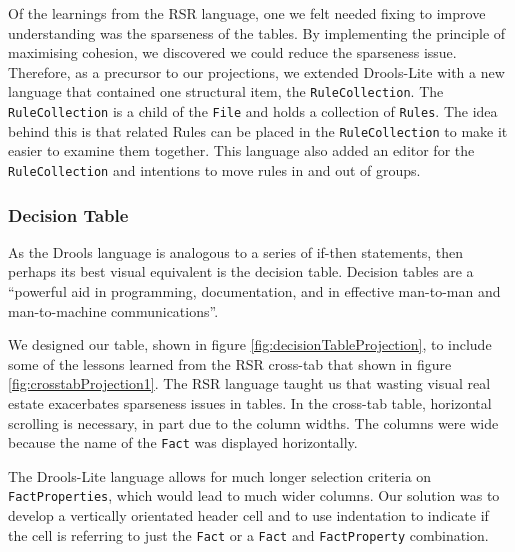 Of the learnings from the RSR language, one we felt needed fixing to improve understanding was the sparseness of the tables.
By implementing the principle of maximising cohesion, we discovered we could reduce the sparseness issue.
Therefore, as a precursor to our projections, we extended Drools-Lite with a new language that contained one structural item, the \texttt{RuleCollection}.
The \texttt{RuleCollection} is a child of the \texttt{File} and holds a collection of \texttt{Rules}.
The idea behind this is that related Rules can be placed in the \texttt{RuleCollection} to make it easier to examine them together.
This language also added an editor for the \texttt{RuleCollection} and intentions to move rules in and out of groups.

\subsubsection{Decision Table}

As the Drools language is analogous to a series of if-then statements, then perhaps its best visual equivalent is the decision table.
Decision tables are a ``powerful aid in programming, documentation, and in effective man-to-man and man-to-machine communications''\cite{pooch1974translation}.

We designed our table, shown in figure \ref{fig:decisionTableProjection}, to include some of the lessons learned from the RSR cross-tab that shown in figure \ref{fig:crosstabProjection1}.
The RSR language taught us that wasting visual real estate exacerbates sparseness issues in tables.
In the cross-tab table, horizontal scrolling is necessary, in part due to the column widths.
The columns were wide because the name of the \texttt{Fact} was displayed horizontally.

The Drools-Lite language allows for much longer selection criteria on \texttt{FactProperties}, which would lead to much wider columns.
Our solution was to develop a vertically orientated header cell and to use indentation to indicate if the cell is referring to just the \texttt{Fact} or a \texttt{Fact} and \texttt{FactProperty} combination.

